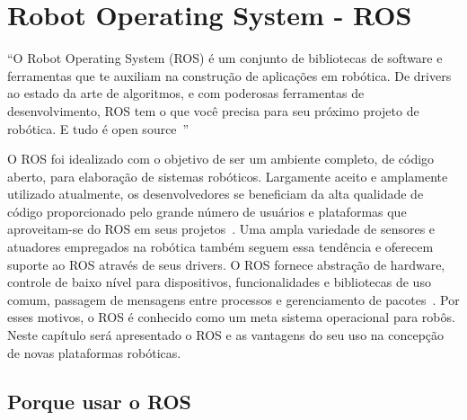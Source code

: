 \chapter{Robot Operating System - ROS}\label{cap:ros}
\begin{citacao}
``O Robot Operating System (ROS) é um conjunto de bibliotecas de software e ferramentas que te auxiliam na construção de aplicações em robótica. De drivers ao estado da arte de algoritmos, e com poderosas ferramentas de desenvolvimento, ROS tem o que você precisa para seu próximo projeto de robótica. E tudo é open source~\cite{Ros}''    
\end{citacao}

O ROS foi idealizado com o objetivo de ser um ambiente completo, de código aberto, para elaboração de sistemas robóticos. Largamente aceito e amplamente utilizado atualmente, os desenvolvedores se beneficiam da alta qualidade de código proporcionado pelo grande número de usuários e plataformas que aproveitam-se do ROS em seus projetos~\cite{RosIntro}. Uma ampla variedade de sensores e atuadores empregados na robótica também seguem essa tendência e oferecem suporte ao ROS através de seus drivers. O ROS fornece abstração de hardware, controle de baixo nível para dispositivos, funcionalidades e bibliotecas de uso comum, passagem de mensagens entre processos e gerenciamento de pacotes~\cite{rosEfetiveProgram}. Por esses motivos, o ROS é conhecido como um meta sistema operacional para robôs. Neste capítulo será apresentado o ROS e as vantagens do seu uso na concepção de novas plataformas robóticas.


\section{Porque usar o ROS}



